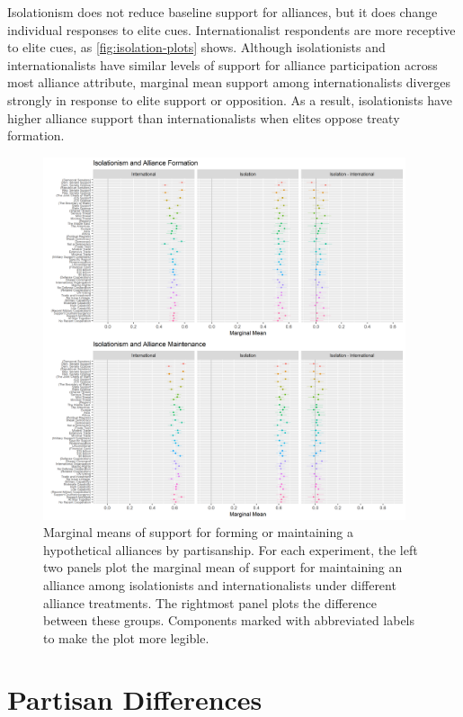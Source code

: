 \documentclass[12pt]{article}
\begin{document}
Isolationism does not reduce baseline support for alliances, but it does change individual responses to elite cues. 
Internationalist respondents are more receptive to elite cues, as \autoref{fig:isolation-plots} shows. 
Although isolationists and internationalists have similar levels of support for alliance participation across most alliance attribute, marginal mean support among internationalists diverges strongly in response to elite support or opposition. 
As a result, isolationists have higher alliance support than internationalists when elites oppose treaty formation. 


\begin{figure}
	\centering
		\includegraphics[width=0.95\textwidth]{isolation-plots.png}
	\caption{Marginal means of support for forming or maintaining a hypothetical alliances by partisanship. For each experiment, the left two panels plot the marginal mean of support for maintaining an alliance among isolationists and internationalists under different alliance treatments. The rightmost panel plots the difference between these groups. Components marked with abbreviated labels to make the plot more legible.}
	\label{fig:isolation-plots}
\end{figure}



\section{Partisan Differences}
\end{document}
